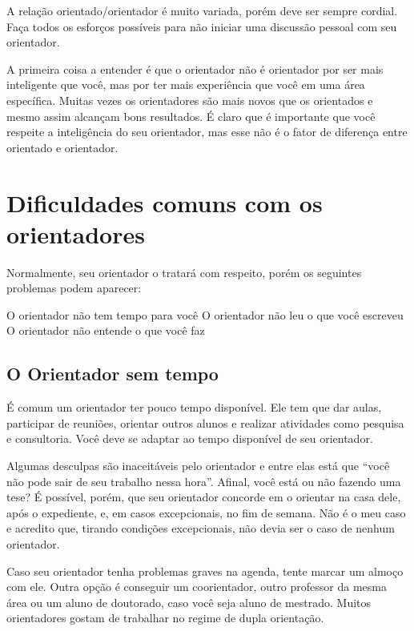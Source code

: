 A relação orientado/orientador é muito variada, porém deve ser sempre cordial. Faça todos os esforços possíveis para não iniciar uma discussão pessoal com seu orientador. 


A primeira coisa a entender é que o orientador não é orientador por ser mais inteligente que você, mas por ter mais experiência que você em uma área específica. Muitas vezes os orientadores são mais novos que os orientados e mesmo assim alcançam bons resultados. É claro que é importante que você respeite a inteligência do seu orientador, mas esse não é o fator de diferença entre orientado e orientador.

\section{Dificuldades comuns com os orientadores}


Normalmente, seu orientador o tratará com respeito, porém os seguintes problemas podem aparecer:

\begin{outline}
\1	O orientador não tem tempo para você
\1	O orientador não leu o que você escreveu
\1	O orientador não entende o que você faz
\end{outline}

\subsection{O Orientador sem tempo}


É comum um orientador ter pouco tempo disponível. Ele tem que dar aulas, participar de reuniões, orientar outros alunos e realizar atividades como pesquisa e consultoria. Você deve se adaptar ao tempo disponível de seu orientador. 


Algumas desculpas são inaceitáveis pelo orientador e entre elas está que ``você não pode sair de seu trabalho nessa hora''. Afinal, você está ou não fazendo uma tese? É possível, porém, que seu orientador concorde em o orientar na casa dele, após o expediente, e, em casos excepcionais, no fim de semana. Não é o meu caso e acredito que, tirando condições excepcionais, não devia ser o caso de nenhum orientador.

Caso seu orientador tenha problemas graves na agenda, tente marcar um almoço com ele. Outra opção é conseguir um coorientador, outro professor da mesma área ou um aluno de doutorado, caso você seja aluno de mestrado. Muitos orientadores gostam de trabalhar no regime de dupla orientação.


